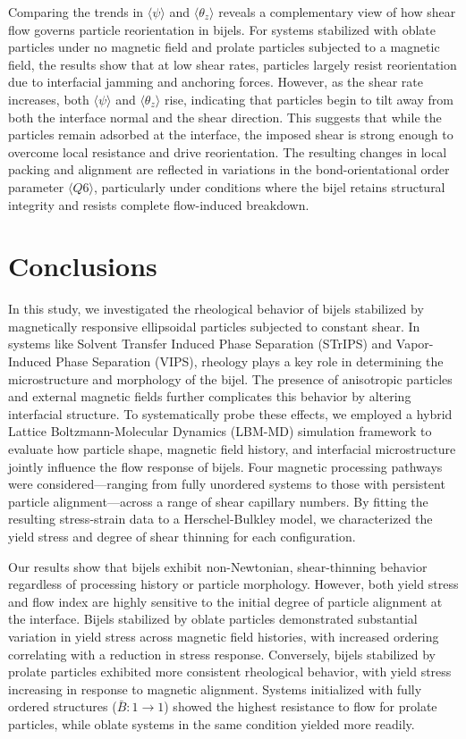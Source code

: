 Comparing the trends in $\langle \psi \rangle$ and $\langle \theta_z \rangle$ reveals a complementary view of how shear flow governs particle reorientation in bijels. For systems 
stabilized with oblate particles under no magnetic field and prolate particles subjected to a magnetic field, the results show that at low shear rates, particles largely resist 
reorientation due to interfacial jamming and anchoring forces. However, as the shear rate increases, both $\langle \psi \rangle$ and $\langle \theta_z \rangle$ rise, indicating that 
particles begin to tilt away from both the interface normal and the shear direction. This suggests that while the particles remain adsorbed at the interface, the imposed shear is strong 
enough to overcome local resistance and drive reorientation. The resulting changes in local packing and alignment are reflected in variations in the bond-orientational order parameter 
$\langle Q6 \rangle$, particularly under conditions where the bijel retains structural integrity and resists complete flow-induced breakdown.

\section{Conclusions}

In this study, we investigated the rheological behavior of bijels stabilized by magnetically responsive ellipsoidal particles subjected to constant shear. 
In systems like Solvent Transfer Induced Phase Separation (STrIPS) and Vapor-Induced Phase Separation (VIPS), rheology plays a key role in determining the
microstructure and morphology of the bijel. The presence of anisotropic particles and external magnetic fields further complicates this behavior 
by altering interfacial structure. To systematically probe these effects, we employed a hybrid Lattice Boltzmann-Molecular Dynamics (LBM-MD) simulation 
framework to evaluate how particle shape, magnetic field history, and interfacial microstructure jointly influence the flow response of bijels. 
Four magnetic processing pathways were considered—ranging from fully unordered systems to those with persistent particle alignment—across a range of 
shear capillary numbers. By fitting the resulting stress-strain data to a Herschel-Bulkley model, we characterized the yield stress and degree of shear 
thinning for each configuration.

Our results show that bijels exhibit non-Newtonian, shear-thinning behavior regardless of processing history or particle morphology. However, both yield stress 
and flow index are highly sensitive to the initial degree of particle alignment at the interface. Bijels stabilized by oblate particles demonstrated substantial 
variation in yield stress across magnetic field histories, with increased ordering correlating with a reduction in stress response. Conversely, bijels stabilized 
by prolate particles exhibited more consistent rheological behavior, with yield stress increasing in response to magnetic alignment. Systems initialized with 
fully ordered structures ($\bar{B}:1 \rightarrow 1$) showed the highest resistance to flow for prolate particles, while oblate systems in the same condition 
yielded more readily.

